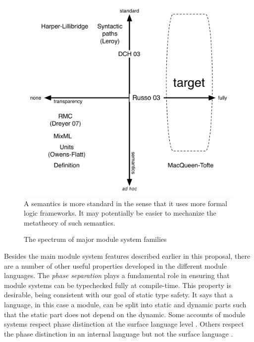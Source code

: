 \begin{figure}
\hrulefill
\includegraphics[scale=0.5]{../design/figs/modsys-spectrum.pdf}
\hrulefill\\
{\small A semantics is more standard in the sense that it uses more formal logic frameworks. It may potentially be easier to mechanize the metatheory of such semantics.}
\caption{The spectrum of major module system families}
\label{fig:spectrum}
\end{figure}

Besides the main module system features described earlier in this proposal, there are a number of other useful properties developed in the different module languages. The \emph{phase separation} \cite{hmm:phasedist} plays a fundamental role in ensuring that module systems can be typechecked fully at compile-time. This property is desirable, being consistent with our goal of static type safety. It says that a language, in this case a module, can be split into static and dynamic parts such that the static part does not depend on the dynamic. Some accounts of module systems respect phase distinction at the surface language level \cite{leroy95,russothesis}. Others respect the phase distinction in an internal language but not the surface language \cite{mt94}.  

